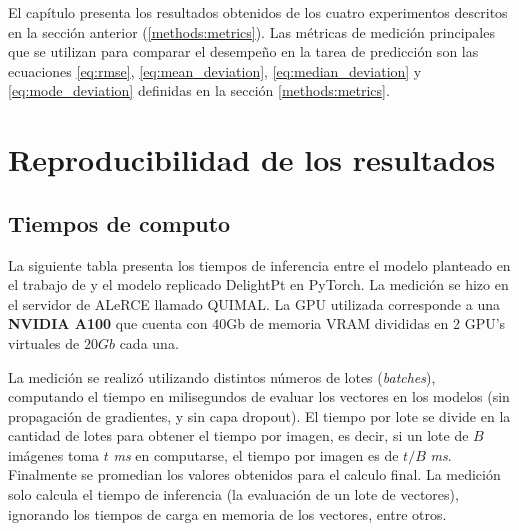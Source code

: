 \documentclass[../tesis.tex]{subfiles}
\begin{document}
El capítulo presenta los resultados obtenidos de los cuatro experimentos descritos en la sección anterior (\ref{methods:metrics}). Las métricas de medición principales que se utilizan para comparar el desempeño en la tarea de predicción son las ecuaciones \ref{eq:rmse}, \ref{eq:mean_deviation}, \ref{eq:median_deviation} y \ref{eq:mode_deviation} definidas en la sección \ref{methods:metrics}.

\section{Reproducibilidad de los resultados} \label{results:replication}

\subsection{Tiempos de computo}
La siguiente tabla presenta los tiempos de inferencia entre el modelo planteado en el trabajo de \cite{delight} y el modelo replicado DelightPt en PyTorch. La medición se hizo en el servidor de ALeRCE llamado QUIMAL. La GPU utilizada corresponde a una \textbf{NVIDIA A100} que cuenta con $40$Gb de memoria VRAM divididas en 2 GPU's virtuales de $20Gb$ cada una.\par\null\par

La medición se realizó utilizando distintos números de lotes (\textit{batches}), computando el tiempo en milisegundos de evaluar los vectores en los modelos (sin propagación de gradientes, y sin capa dropout). El tiempo por lote se divide en la cantidad de lotes para obtener el tiempo por imagen, es decir, si un lote de $B$ imágenes toma $t$ \textit{ms} en computarse, el tiempo por imagen es de $t / B$ \textit{ms}. Finalmente se promedian los valores obtenidos para el calculo final. La medición solo calcula el tiempo de inferencia (la evaluación de un lote de vectores), ignorando los tiempos de carga en memoria de los vectores, entre otros.\par\null\par
\end{document}
